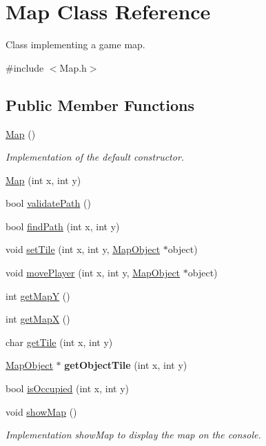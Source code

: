\hypertarget{class_map}{}\section{Map Class Reference}
\label{class_map}


Class implementing a game map.  




{\ttfamily \#include $<$Map.\+h$>$}

\subsection*{Public Member Functions}
\begin{DoxyCompactItemize}
\item 
\hypertarget{class_map_a0f5ad0fd4563497b4214038cbca8b582}{}\label{class_map_a0f5ad0fd4563497b4214038cbca8b582} 
\hyperlink{class_map_a0f5ad0fd4563497b4214038cbca8b582}{Map} ()
\begin{DoxyCompactList}\small\item\em Implementation of the default constructor. \end{DoxyCompactList}\item 
\hyperlink{class_map_a7dd574b3746a45123fd765945b6a2a7e}{Map} (int x, int y)
\item 
bool \hyperlink{class_map_a91d9e239a9871b99a5d6d2d5d46b0504}{validate\+Path} ()
\item 
bool \hyperlink{class_map_a37b9af3a5474a3a1511bee4d25f64080}{find\+Path} (int x, int y)
\item 
void \hyperlink{class_map_a8ef7709889bed2d6c5fd9db04c803a65}{set\+Tile} (int x, int y, \hyperlink{class_map_object}{Map\+Object} $\ast$object)
\item 
void \hyperlink{class_map_a57a51049895645c97218ae99f022ec94}{move\+Player} (int x, int y, \hyperlink{class_map_object}{Map\+Object} $\ast$object)
\item 
int \hyperlink{class_map_af8a681239a6799298e90f2d735809dd2}{get\+MapY} ()
\item 
int \hyperlink{class_map_a5f45c5651757dbc8c2a1b3387cc35ced}{get\+MapX} ()
\item 
char \hyperlink{class_map_a3406173205ffe290a65db538e466e60d}{get\+Tile} (int x, int y)
\item 
\hypertarget{class_map_a068ee62689171ced11e1964770b2838d}{}\label{class_map_a068ee62689171ced11e1964770b2838d} 
\hyperlink{class_map_object}{Map\+Object} $\ast$ {\bfseries get\+Object\+Tile} (int x, int y)
\item 
bool \hyperlink{class_map_a79e5ced99d160ca9b680661169f16d84}{is\+Occupied} (int x, int y)
\item 
\hypertarget{class_map_a36679bcc048d59f8e2b8ccc81598200c}{}\label{class_map_a36679bcc048d59f8e2b8ccc81598200c} 
void \hyperlink{class_map_a36679bcc048d59f8e2b8ccc81598200c}{show\+Map} ()
\begin{DoxyCompactList}\small\item\em Implementation show\+Map to display the map on the console. \end{DoxyCompactList}\end{DoxyCompactItemize}
